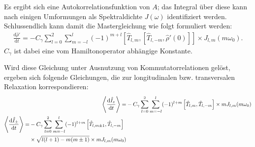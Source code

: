 Es ergibt sich eine Autokorrelationsfunktion von $A$; das Integral über diese kann nach einigen Umformungen als Spektraldichte $J(\omega)$ identifiziert werden. Schlussendlich kann damit die Mastergleichung wie folgt formuliert werden:
\begin{align}
    \frac{\text{d} \hat{\rho}'}{\text{d}t} = - C_\gamma \sum_{l = 0}^2 \sum_{m = -l}^l (-1)^{m+l} \left[\hat{T}_{l,m}, [\hat{T}_{l,-m}, \hat{\rho}'(0)] \right] \times J_{l,m}(m \omega_0).
\end{align}
$C_\gamma$ ist dabei eine vom Hamiltonoperator abhängige Konstante.

Wird diese Gleichung unter Ausnutzung von Kommutatorrelationen gelöst, ergeben sich folgende Gleichungen, die zur longitudinalen bzw. transversalen Relaxation korrespondieren:
\begin{align}
    \Braket{\frac{\text{d} \hat{I}_z}{\text{d}t}} =& - C_\gamma \sum_{l = 0}^2 \sum_{m = -l}^l (-1)^{l+m} \left[\hat{T}_{l,m}, \hat{T}_{l,-m}\right] \times m J_{l,m}(m \omega_0) \label{eqn:long_relax_theorie} \\
\begin{split}
    \Braket{\frac{\text{d} \hat{I}_\pm}{\text{d}t}} =& - C_\gamma \sum_{l = 0}^2 \sum_{m = -l}^l (-1)^{l+m} \left[\hat{T}_{l,m \pm 1}, \hat{T}_{l,-m}\right] \\ &\times \sqrt{l(l+1) - m(m \pm 1)} \times m J_{l,m}(m \omega_0) \label{eqn:trans_relax_theorie}
\end{split}
\end{align}


